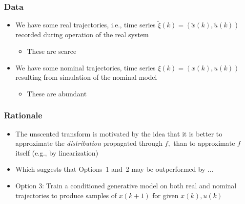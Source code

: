 \documentclass[aspectratio=169,handout]{beamer} 	%
\begin{document}
\begin{frame}
	\frametitle{Data}
	\begin{itemize}[<+->]
		\itemsep \baselineskip
		
		\item We have some \alert{real trajectories}, i.e., time series 
		$\tilde{\xi}(k) = (\tilde{x}(k), \tilde{u}(k))$ recorded during 
		operation of the real system
		\begin{itemize}
			\item These are scarce
		\end{itemize}
		
		\item We have some \alert{nominal trajectories}, time series 
		$\xi(k) = (x(k), u(k))$ resulting from simulation of the nominal model
		\begin{itemize}
			\item These are abundant
		\end{itemize}
		
	\end{itemize}
	
\end{frame}





\begin{frame}
	\frametitle{Rationale}
	\begin{itemize}[<+->]
		\itemsep \baselineskip
		
		\item The unscented transform is motivated by the idea that it is better to
		approximate the \emph{distribution} propagated through $f,$ than to approximate
		$f$ itself (e.g., by linearization)
		
		\item Which suggests that Options~1 and~2 may be outperformed by ...
		
		\item \alert{Option 3:} Train a conditioned generative model on both
		real and nominal trajectories to produce samples of 
		$x(k + 1)$ for given $x(k), u(k)$
	
		
	\end{itemize}
	
\end{frame}
\end{document}
